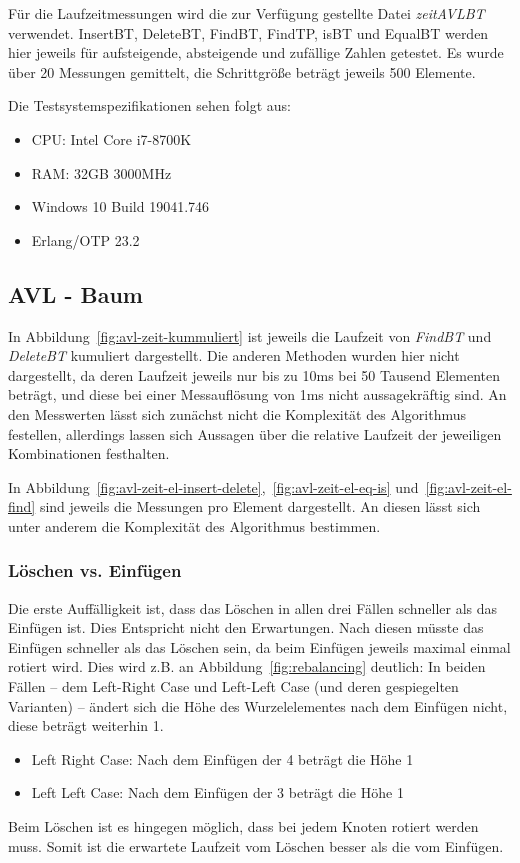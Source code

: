 Für die Laufzeitmessungen wird die zur Verfügung gestellte Datei \textit{zeitAVLBT} verwendet.
InsertBT, DeleteBT, FindBT, FindTP, isBT und EqualBT werden hier jeweils für aufsteigende,
absteigende und zufällige Zahlen getestet.
Es wurde über 20 Messungen gemittelt, die Schrittgröße beträgt jeweils 500 Elemente.

Die Testsystemspezifikationen sehen folgt aus:
\begin{itemize}
    \item CPU: Intel Core i7-8700K
    \item RAM: 32GB 3000MHz
    \item Windows 10 Build 19041.746
    \item Erlang/OTP 23.2
\end{itemize}

\subsection{AVL - Baum}\label{subsec:laufzeitmessung-avl}

In Abbildung~\ref{fig:avl-zeit-kummuliert} ist jeweils die Laufzeit von \textit{FindBT} und
\textit{DeleteBT} kumuliert dargestellt.
Die anderen Methoden wurden hier nicht dargestellt, da deren Laufzeit jeweils nur bis zu 10ms bei
50 Tausend Elementen beträgt, und diese bei einer Messauflösung von 1ms nicht aussagekräftig
sind.
An den Messwerten lässt sich zunächst nicht die Komplexität des Algorithmus festellen,
allerdings lassen sich Aussagen über die relative Laufzeit der jeweiligen Kombinationen festhalten.

In Abbildung~\ref{fig:avl-zeit-el-insert-delete},~\ref{fig:avl-zeit-el-eq-is}
und~\ref{fig:avl-zeit-el-find} sind jeweils die Messungen pro Element dargestellt.
An diesen lässt sich unter anderem die Komplexität des Algorithmus bestimmen.

\subsubsection{Löschen vs. Einfügen}
Die erste Auffälligkeit ist, dass das Löschen in allen drei Fällen schneller als das Einfügen ist.
Dies Entspricht nicht den Erwartungen.
Nach diesen müsste das Einfügen schneller als das Löschen sein, da beim Einfügen jeweils maximal
einmal rotiert wird.
Dies wird z.B. an Abbildung~\ref{fig:rebalancing} deutlich:
In beiden Fällen -- dem Left-Right Case und Left-Left Case (und deren gespiegelten Varianten) --
ändert sich die Höhe des Wurzelelementes nach dem Einfügen nicht, diese beträgt weiterhin 1.
\begin{itemize}
    \item Left Right Case: Nach dem Einfügen der 4 beträgt die Höhe 1
    \item Left Left Case: Nach dem Einfügen der 3 beträgt die Höhe 1
\end{itemize}
Beim Löschen ist es hingegen möglich, dass bei jedem Knoten rotiert werden muss.
Somit ist die erwartete Laufzeit vom Löschen besser als die vom Einfügen.

